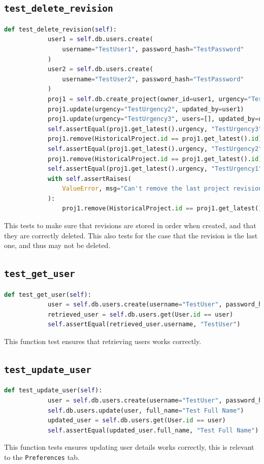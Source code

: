 \documentclass{report}
\begin{document}
	\subsection{\texttt{test\_delete\_revision}}
	\vspace{1em}
	\begin{lstlisting}[language=Python]
		def test_delete_revision(self):
			user1 = self.db.users.create(
				username="TestUser1", password_hash="TestPassword"
			)
			user2 = self.db.users.create(
				username="TestUser2", password_hash="TestPassword"
			)
			proj1 = self.db.create_project(owner_id=user1, urgency="TestUrgency1")
			proj1.update(urgency="TestUrgency2", updated_by=user1)
			proj1.update(urgency="TestUrgency3", users=[], updated_by=user1)
			self.assertEqual(proj1.get_latest().urgency, "TestUrgency3")
			proj1.remove(HistoricalProject.id == proj1.get_latest().id)
			self.assertEqual(proj1.get_latest().urgency, "TestUrgency2")
			proj1.remove(HistoricalProject.id == proj1.get_latest().id)
			self.assertEqual(proj1.get_latest().urgency, "TestUrgency1")
			with self.assertRaises(
				ValueError, msg="Can't remove the last project revision"
			):
				proj1.remove(HistoricalProject.id == proj1.get_latest().id)
	\end{lstlisting}
	This tests to make sure that revisions are stored in order when created, and that
	they are correctly deleted. This also tests for the case that the revision is the last one,
	and thus may not be deleted.
	
	\subsection{\texttt{test\_get\_user}}
	\vspace{1em}
	\begin{lstlisting}[language=Python]
		def test_get_user(self):
			user = self.db.users.create(username="TestUser", password_hash="TestHash")
			retrieved_user = self.db.users.get(User.id == user)
			self.assertEqual(retrieved_user.username, "TestUser")
	\end{lstlisting}
	\vspace{1em}
	This function test ensures that retrieving users works correctly.
	
	\subsection{\texttt{test\_update\_user}}
	\vspace{1em}
	\begin{lstlisting}[language=Python]
		def test_update_user(self):
			user = self.db.users.create(username="TestUser", password_hash="TestHash")
			self.db.users.update(user, full_name="Test Full Name")
			updated_user = self.db.users.get(User.id == user)
			self.assertEqual(updated_user.full_name, "Test Full Name")
	\end{lstlisting}
	\vspace{1em}
	This function tests ensures updating user details works correctly, this is relevant
	to the \verb|Preferences| tab.
	
\end{document}

